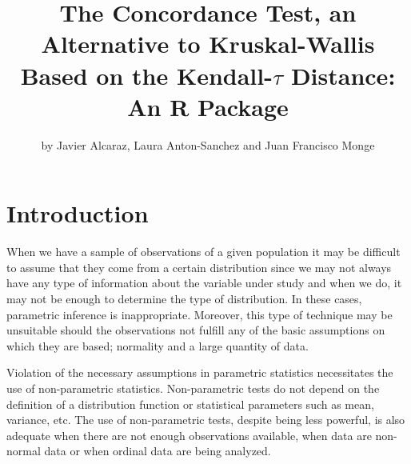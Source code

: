 \title{The Concordance Test, an Alternative to Kruskal-Wallis Based on the Kendall-$\tau$ Distance: An R Package}
\author{by Javier Alcaraz, Laura Anton-Sanchez and Juan Francisco Monge}

\maketitle


\section{Introduction} \label{sec:intro}

When we have a sample of observations of a given population it may be difficult to assume that they come from a certain distribution since we may not always have any type of information about the variable under study and when we do, it may not be enough to determine the type of distribution. In these cases, parametric inference is inappropriate. Moreover, this type of technique may be unsuitable should the observations not fulfill any of the basic assumptions on which they are based; normality and a large quantity of data.

Violation of the necessary assumptions in parametric statistics necessitates the use of non-parametric statistics. Non-parametric tests do not depend on the definition of a distribution function or statistical parameters such as mean, variance, etc. The use of non-parametric tests, despite being less powerful, is also adequate when there are not enough observations available, when data are non-normal data or when ordinal data are being analyzed.

